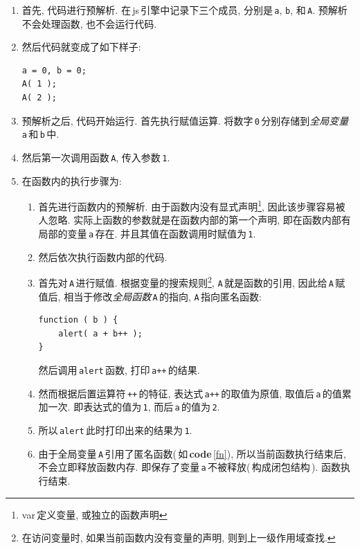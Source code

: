 \documentclass[UTF8, noindent]{ctexart}
\renewcommand{\lstlistingname}{{\footnotesize\bfseries code}}
\newcommand{\coderef}[1]{\lstlistingname\,\ref{#1}}
\begin{document}
\begin{enumerate}

\item 首先, 代码进行预解析. 在\,js\,引擎中记录下三个成员, 分别是\,\lstinline|a|, \lstinline|b|, 
      和\,\lstinline|A|. 预解析不会处理函数, 也不会运行代码.
\item 然后代码就变成了如下样子:

\begin{lstlisting}
a = 0, b = 0;
A( 1 );
A( 2 );
\end{lstlisting}

\item 预解析之后, 代码开始运行. 首先执行赋值运算. 
      将数字\,\lstinline|0|\,分别存储到\emph{全局变量}\,\lstinline|a|\,和\,\lstinline|b|\,中.
\item 然后第一次调用函数\,\lstinline|A|, 传入参数\,\lstinline|1|.
\item 在函数内的执行步骤为:

    \begin{enumerate}
    \item 首先进行函数内的预解析. 由于函数内没有显式声明\footnote{var\,定义变量, 或独立的函数声明}, 
          因此该步骤容易被人忽略. 实际上函数的参数就是在函数内部的第一个声明, 
          即在函数内部有局部的变量\,\lstinline|a|\,存在. 并且其值在函数调用时赋值为\,\lstinline|1|.
    \item 然后依次执行函数内部的代码. 
    \item 首先对\,\lstinline|A|\,进行赋值. 根据变量的搜索规则\footnote{在访问变量时, 如果当前函数内没有变量的声明, 则到上一级作用域查找.}, 
          \lstinline|A|\,就是函数的引用, 因此给\,\lstinline|A|\,赋值后, 
          相当于修改\emph{全局函数}\,\lstinline|A|\,的指向, \lstinline|A|\,指向匿名函数:
{\begin{lstlisting}[caption={\footnotesize 匿名函数}, label=fn]
function ( b ) {
    alert( a + b++ );
}
\end{lstlisting}}

          然后调用\,\lstinline|alert|\,函数, 打印\,\lstinline|a++|\,的结果.
    \item 然而根据后置运算符\,\lstinline|++|\,的特征, 表达式\,\lstinline|a++|\,的取值为原值, 
          取值后\,\lstinline|a|\,的值累加一次. 即表达式的值为\,\lstinline|1|, 
          而后\,\lstinline|a|\,的值为\,\lstinline|2|.
    \item 所以\,\lstinline|alert|\,此时打印出来的结果为\,\lstinline|1|.
    \item 由于全局变量\,\lstinline|A|\,引用了匿名函数(\,如\,\coderef{fn}), 所以当前函数执行结束后, 不会立即释放函数内存. 
          即保存了变量\,\lstinline|a|\,不被释放(\,构成闭包结构\,). 函数执行结束.
    \end{enumerate}


\end{enumerate}
\end{document}
